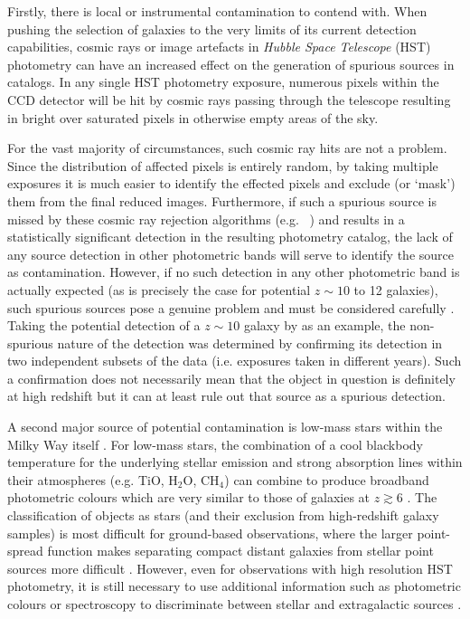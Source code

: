 Firstly, there is local or instrumental contamination to contend with. When pushing the selection of galaxies to the very limits of its current detection capabilities, cosmic rays or image artefacts in \emph{Hubble Space Telescope} (HST) photometry can have an increased effect on the generation of spurious sources in catalogs. In any single HST photometry exposure, numerous pixels within the CCD detector will be hit by cosmic rays passing through the telescope resulting in bright over saturated pixels in otherwise empty areas of the sky. 

For the vast majority of circumstances, such cosmic ray hits are not a problem. Since the distribution of affected pixels is entirely random, by taking multiple exposures it is much easier to identify the effected pixels and exclude (or `mask') them from the final reduced images. Furthermore, if such a spurious source is missed by these cosmic ray rejection algorithms (e.g. \citeauthor{vanDokkum:2001go}~\citeyear{vanDokkum:2001go}) and results in a statistically significant detection in the resulting photometry catalog, the lack of any source detection in other photometric bands will serve to identify the source as contamination. However, if no such detection in any other photometric band is actually expected (as is precisely the case for potential $z\sim 10$ to 12 galaxies), such spurious sources pose a genuine problem and must be considered carefully \citep{Bouwens:2011el}. Taking the potential detection of a $z\sim10$ galaxy by \citet{Bouwens:2011el} as an example, the non-spurious nature of the detection was determined by confirming its detection in two independent subsets of the data (i.e. exposures taken in different years). Such a confirmation does not necessarily mean that the object in question is definitely at high redshift \citep{Brammer:2013dg} but it can at least rule out that source as a spurious detection.

A second major source of potential contamination is low-mass stars within the Milky Way itself \citep{Caballero:2008ea}. For low-mass stars, the combination of a cool blackbody temperature for the underlying stellar emission and strong absorption lines within their atmospheres (e.g. TiO, H$_{2}$O, CH$_{4}$) can combine to produce broadband photometric colours which are very similar to those of galaxies at $z \gtrsim 6$ \citep{Finkelstein:2014ub,Wilkins:2014jp}. The classification of objects as stars (and their exclusion from high-redshift galaxy samples) is most difficult for ground-based observations, where the larger point-spread function makes separating compact distant galaxies from stellar point sources more difficult \citep{Bowler:vl,Bowler:2013wz}. However, even for observations with high resolution HST photometry, it is still necessary to use additional information such as photometric colours or spectroscopy to discriminate between stellar and extragalactic sources \citep{Stanway:2008fj,Pirzkal:2009cg}.

